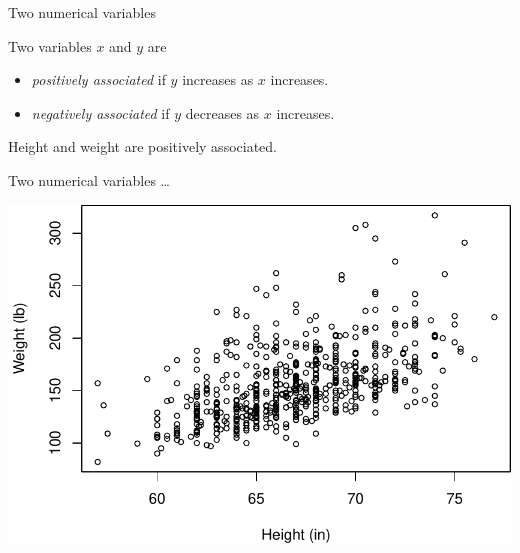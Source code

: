 \documentclass[
  ignorenonframetext,
]{beamer}
\newenvironment{Shaded}{\begin{snugshade}}{\end{snugshade}}
\newcommand{\DataTypeTok}[1]{\textcolor[rgb]{0.13,0.29,0.53}{#1}}
\newcommand{\FloatTok}[1]{\textcolor[rgb]{0.00,0.00,0.81}{#1}}
\newcommand{\KeywordTok}[1]{\textcolor[rgb]{0.13,0.29,0.53}{\textbf{#1}}}
\newcommand{\NormalTok}[1]{#1}
\newcommand{\OperatorTok}[1]{\textcolor[rgb]{0.81,0.36,0.00}{\textbf{#1}}}
\newcommand{\StringTok}[1]{\textcolor[rgb]{0.31,0.60,0.02}{#1}}
\begin{document}
\begin{frame}{Two numerical variables}
\protect\hypertarget{two-numerical-variables}{}

Two variables \(x\) and \(y\) are

\begin{itemize}
\item
  \emph{positively associated} if \(y\) increases as \(x\) increases.
\item
  \emph{negatively associated} if \(y\) decreases as \(x\) increases.
\end{itemize}

Height and weight are positively associated.

\end{frame}

\begin{frame}[fragile]{Two numerical variables \dots}
\protect\hypertarget{two-numerical-variables-1}{}

\small

\scriptsize

\begin{Shaded}
\end{Shaded}

\begin{center}\includegraphics[width=1\linewidth]{001-exploring-data_files/figure-beamer/scatter_height_weight-1} \end{center}

\normalsize

\end{frame}
\end{document}
